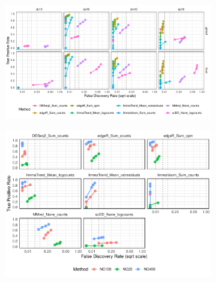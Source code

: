 \documentclass[a4paper, 11pt, twocolumn]{article}
\begin{document}
\begin{figure}[h]
	\centering
	\begin{subfigure}[t]{0.9\textwidth}
		\centering
		\includegraphics[width=\textwidth]{figs/fdrtpr_prop_method_Kang.pdf}
		\caption{}
		\label{fig:fdrtpr_prop_kang}
	\end{subfigure}
	
	\vspace{1em}
	
	\begin{subfigure}[t]{0.8\textwidth}
		\centering
		\includegraphics[width=\textwidth]{figs/fdrtpr_size_method_Kang.pdf}
		\caption{}
		\label{fig:fdrtpr_size}
	\end{subfigure}
	

\end{figure}
\end{document}
